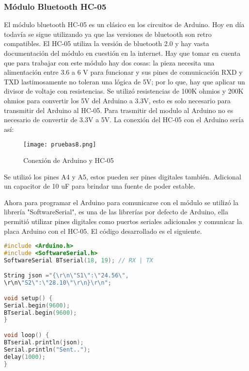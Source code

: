 \subsubsection{Módulo Bluetooth HC-05}
\par
El módulo bluetooth HC-05 es un clásico en los circuitos de Arduino. Hoy en día todavía se sigue utilizando ya que las versiones de bluetooth son retro compatibles. El HC-05 utiliza la versión de bluetooth 2.0 y hay vasta documentación del módulo en cuestión en la internet. Hay que tomar en cuenta que para trabajar con este módulo hay dos cosas: la pieza necesita una alimentación entre 3.6 a 6 V para funcionar y sus pines de comunicación RXD y TXD lastimosamente no toleran una lógica de 5V; por lo que, hay que aplicar un divisor de voltaje con resistencias. Se utilizó resistencias de 100K ohmios y 200K ohmios para convertir los 5V del Arduino a 3.3V, esto es solo necesario para transmitir del Arduino al HC-05. Para trasmitir del modulo al Arduino no es necesario de convertir de 3.3V a 5V. La conexión del HC-05 con el Arduino sería así:

\begin{figure}[H]
	\centering
	\texttt{[image: pruebas8.png]}
	\caption{Conexión de Arduino y HC-05}
\end{figure} 

\par \noindent
Se utilizó los pines A4 y A5, estos pueden ser pines digitales también. Adicional un capacitor de 10 uF para brindar una fuente de poder estable.

\par \noindent
Ahora para programar el Arduino para comunicarse con el módulo se utilizó la librería "SoftwareSerial", es una de las librerías por defecto de Arduino, ella permitió utilizar pines digitales como puertos seriales adicionales y comunicar la placa Arduino con el HC-05. El código desarrollado es el siguiente.


\begin{lstlisting}[language=C++, caption={Codigo Ejemplo para módulo HC-05}, captionpos=b]
#include <Arduino.h>
#include <SoftwareSerial.h>
SoftwareSerial BTserial(18, 19); // RX | TX

String json ="{\r\n\"S1\":\"24.56\",
\r\n\"S2\":\"28.10\"\r\n}\r\n";

void setup() {
Serial.begin(9600);
BTserial.begin(9600);  
}

void loop() {
BTserial.println(json); 
Serial.println("Sent.."); 
delay(1000); 
}
\end{lstlisting} 

